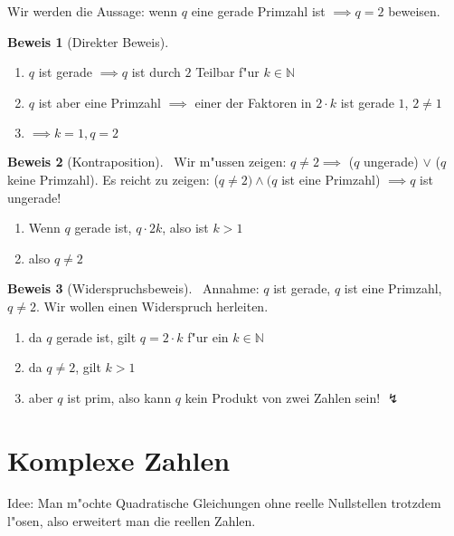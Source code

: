 \documentclass[oneside,fontsize=11pt,paper=a4,BCOR=0mm,DIV=12,automark,headsepline]{scrbook}
\theoremstyle{remark}
\theoremstyle{definition}
\theoremstyle{definition}
\newtheorem*{prof}{Beweis}
\theoremstyle{remark}
\begin{document}
\begin{exa}
  Wir werden die Aussage: wenn \(q\) eine gerade Primzahl ist \(\implies q=2\)
  beweisen.

  \begin{prof}[Direkter Beweis] \
    \begin{enumerate}
    \item \(q\) ist gerade \(\implies q\) ist durch \(2\) Teilbar f"ur \(k\in\mathbb{N}\)
    \item \(q\) ist aber eine Primzahl \(\implies\) einer der Faktoren in \(2\cdot k\) ist
      gerade \(1\), \(2\not= 1\)
    \item \(\implies k=1, q=2\)
    \end{enumerate}
  \end{prof}

  \begin{prof}[Kontraposition] \
    Wir m"ussen zeigen: \(q\not= 2\implies\) (\(q\) ungerade) \(\vee\) (\(q\) keine
    Primzahl). Es reicht zu zeigen: (\(q\not=2)\wedge(q\) ist eine Primzahl)
    \(\implies q\) ist ungerade!
    \begin{enumerate}
    \item Wenn \(q\) gerade ist, \(q\cdot 2k\), also ist \(k>1\)
    \item also \(q\not= 2\)
    \end{enumerate}
  \end{prof}

  \begin{prof}[Widerspruchsbeweis] \
    Annahme: \(q\) ist gerade, \(q\) ist eine Primzahl, \(q\not= 2\). Wir wollen einen
    Widerspruch herleiten.

    \begin{enumerate}
    \item da \(q\) gerade ist, gilt \(q=2\cdot k\) f"ur ein \(k\in \mathbb{N}\)
    \item da \(q\not= 2\), gilt \(k>1\)
    \item aber \(q\) ist prim, also kann \(q\) kein Produkt von zwei Zahlen sein! \(\lightning\)
    \end{enumerate}
  \end{prof}
\end{exa}

\chapter{Komplexe Zahlen}
\label{sec:org73b0a26}
Idee: Man m"ochte Quadratische Gleichungen ohne reelle Nullstellen trotzdem
l"osen, also erweitert man die reellen Zahlen.
\end{document}
